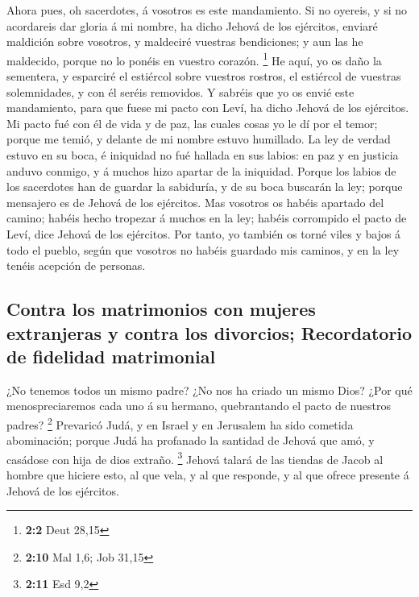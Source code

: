  Ahora pues, oh sacerdotes, á vosotros es este mandamiento.
 Si no oyereis, y si no acordareis dar gloria á mi nombre,
ha dicho Jehová de los ejércitos, enviaré maldición sobre vosotros, y
maldeciré vuestras bendiciones; y aun las he maldecido, porque no lo
ponéis en vuestro corazón. \footnote{\textbf{2:2} Deut 28,15}
 He aquí, yo os daño la sementera, y esparciré el estiércol
sobre vuestros rostros, el estiércol de vuestras solemnidades, y con él
seréis removidos.  Y sabréis que yo os envié este
mandamiento, para que fuese mi pacto con Leví, ha dicho Jehová de los
ejércitos.  Mi pacto fué con él de vida y de paz, las cuales
cosas yo le dí por el temor; porque me temió, y delante de mi nombre
estuvo humillado.  La ley de verdad estuvo en su boca, é
iniquidad no fué hallada en sus labios: en paz y en justicia anduvo
conmigo, y á muchos hizo apartar de la iniquidad.  Porque
los labios de los sacerdotes han de guardar la sabiduría, y de su boca
buscarán la ley; porque mensajero es de Jehová de los ejércitos.
 Mas vosotros os habéis apartado del camino; habéis hecho
tropezar á muchos en la ley; habéis corrompido el pacto de Leví, dice
Jehová de los ejércitos.  Por tanto, yo también os torné
viles y bajos á todo el pueblo, según que vosotros no habéis guardado
mis caminos, y en la ley tenéis acepción de personas.

\hypertarget{contra-los-matrimonios-con-mujeres-extranjeras-y-contra-los-divorcios-recordatorio-de-fidelidad-matrimonial}{%
\subsection{Contra los matrimonios con mujeres extranjeras y contra los
divorcios; Recordatorio de fidelidad
matrimonial}\label{contra-los-matrimonios-con-mujeres-extranjeras-y-contra-los-divorcios-recordatorio-de-fidelidad-matrimonial}}

 ¿No tenemos todos un mismo padre? ¿No nos ha criado un
mismo Dios? ¿Por qué menospreciaremos cada uno á su hermano,
quebrantando el pacto de nuestros padres? \footnote{\textbf{2:10} Mal
  1,6; Job 31,15}  Prevaricó Judá, y en Israel y en
Jerusalem ha sido cometida abominación; porque Judá ha profanado la
santidad de Jehová que amó, y casádose con hija de dios extraño.
\footnote{\textbf{2:11} Esd 9,2}  Jehová talará de las
tiendas de Jacob al hombre que hiciere esto, al que vela, y al que
responde, y al que ofrece presente á Jehová de los ejércitos.


